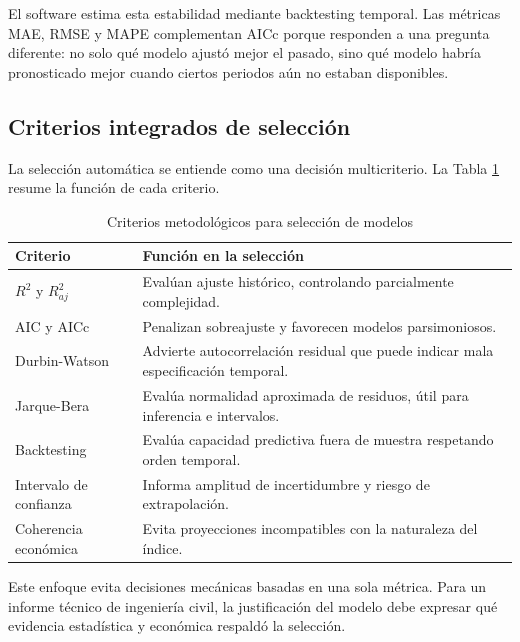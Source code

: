 El software estima esta estabilidad mediante backtesting temporal. Las métricas MAE, RMSE y MAPE complementan AICc porque responden a una pregunta diferente: no solo qué modelo ajustó mejor el pasado, sino qué modelo habría pronosticado mejor cuando ciertos periodos aún no estaban disponibles.

\subsection{Criterios integrados de selección}

La selección automática se entiende como una decisión multicriterio. La Tabla \ref{tab:criterios_seleccion} resume la función de cada criterio.

\begin{table}[H]
\centering
\caption{Criterios metodológicos para selección de modelos}
\label{tab:criterios_seleccion}
\begin{tabular}{p{}p{}}
\toprule
\textbf{Criterio} & \textbf{Función en la selección} \\
\midrule
\(R^2\) y \(R^2_{aj}\) & Evalúan ajuste histórico, controlando parcialmente complejidad. \\
AIC y AICc & Penalizan sobreajuste y favorecen modelos parsimoniosos. \\
Durbin-Watson & Advierte autocorrelación residual que puede indicar mala especificación temporal. \\
Jarque-Bera & Evalúa normalidad aproximada de residuos, útil para inferencia e intervalos. \\
Backtesting & Evalúa capacidad predictiva fuera de muestra respetando orden temporal. \\
Intervalo de confianza & Informa amplitud de incertidumbre y riesgo de extrapolación. \\
Coherencia económica & Evita proyecciones incompatibles con la naturaleza del índice. \\
\bottomrule
\end{tabular}
\end{table}

Este enfoque evita decisiones mecánicas basadas en una sola métrica. Para un informe técnico de ingeniería civil, la justificación del modelo debe expresar qué evidencia estadística y económica respaldó la selección.
